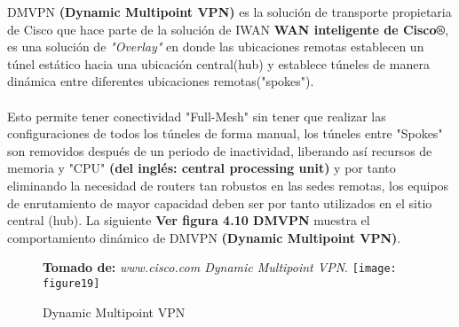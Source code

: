 DMVPN \textbf{(Dynamic Multipoint VPN)} es la solución de transporte propietaria de Cisco que hace parte de la solución de IWAN \textbf{WAN inteligente de Cisco®}, es una solución de \textit{"Overlay"} en donde las ubicaciones remotas establecen un túnel estático hacia una ubicación central(hub) y establece túneles de manera dinámica entre diferentes ubicaciones remotas("spokes").
\\
\\
Esto permite tener conectividad "Full-Mesh" sin tener que realizar las configuraciones de todos los túneles de forma manual, los túneles entre "Spokes" son removidos después de un periodo de inactividad, liberando así recursos de memoria y "CPU" \textbf{(del inglés: central processing unit)} y por tanto eliminando la necesidad de routers tan robustos en las sedes remotas, los equipos de enrutamiento de mayor capacidad deben ser por tanto utilizados en el sitio central (hub). La siguiente \textbf{Ver figura 4.10 DMVPN} muestra el comportamiento dinámico de DMVPN \textbf{(Dynamic Multipoint VPN)}.
\begin{figure}[htbp]
 \textbf{Tomado de:} \textit{www.cisco.com Dynamic Multipoint VPN}.
  \centering
    {\texttt{[image: figure19]}}%
  \caption{Dynamic Multipoint VPN}
    \label{fig:dynamic}
\end{figure}

